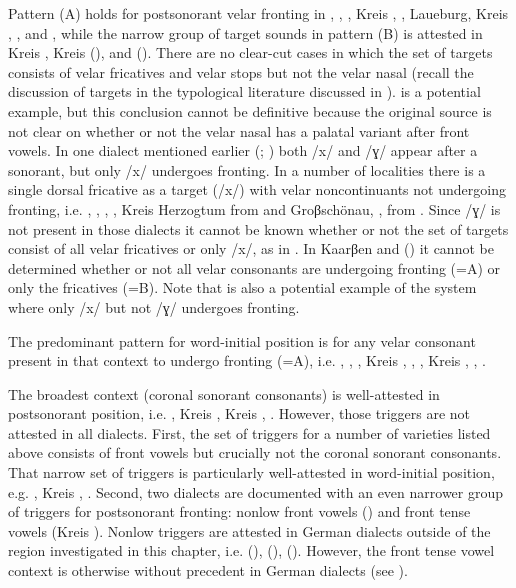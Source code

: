 Pattern (A) holds for postsonorant velar fronting in , , , Kreis , , Laueburg, Kreis , , and , while the narrow group of target sounds in pattern (B) is attested in Kreis , Kreis  (), and  (). There are no clear-cut cases in which the set of targets consists of velar fricatives and velar stops but not the velar nasal (recall the discussion of targets in the typological literature discussed in ).  is a potential example, but this conclusion cannot be definitive because the original source is not clear on whether or not the velar nasal has a palatal variant after front vowels. In one dialect mentioned earlier (; ) both /x/ and /ɣ/ appear after a sonorant, but only /x/ undergoes fronting. In a number of localities there is a single dorsal fricative as a target (/x/) with velar noncontinuants not undergoing fronting, i.e. , , , , Kreis Herzogtum  from  and Groβschönau, ,  from . Since /ɣ/ is not present in those dialects it cannot be known whether or not the set of targets consist of all velar fricatives or only /x/, as in . In Kaarβen and  () it cannot be determined whether or not all velar consonants are undergoing fronting (=A) or only the fricatives (=B). Note that  is also a potential example of the  system where only /x/ but not /ɣ/ undergoes fronting.

The predominant pattern for word-initial position is for any velar consonant present in that context to undergo fronting (=A), i.e. , , , Kreis , , , Kreis , , .

The broadest context (coronal sonorant consonants) is well-attested in postsonorant position, i.e. , Kreis , Kreis , . However, those triggers are not attested in all dialects. First, the set of triggers for a number of varieties listed above consists of front vowels but crucially not the coronal sonorant consonants. That narrow set of triggers is particularly well-attested in word-initial position, e.g. , Kreis , . Second, two dialects are documented with an even narrower group of triggers for postsonorant fronting: nonlow front vowels () and front tense vowels (Kreis ). Nonlow triggers are attested in German dialects outside of the region investigated in this chapter, i.e.  (),  (),  (). However, the front tense vowel context is otherwise without precedent in German dialects (see ).

